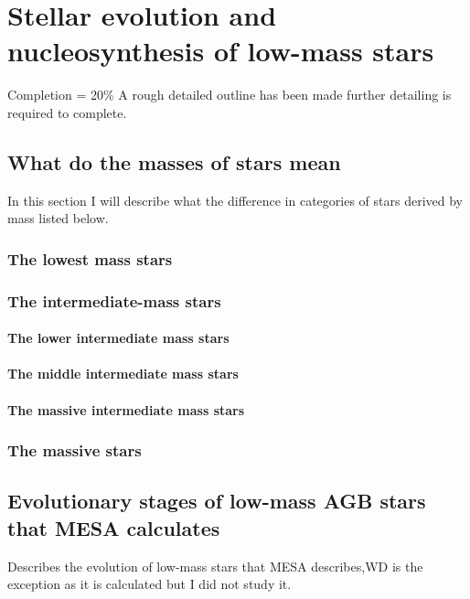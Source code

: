 \chapter{Stellar evolution and nucleosynthesis of low-mass stars}

Completion = 20\% 
A rough detailed outline has been made further detailing is required to complete.

\section{What do the masses of stars mean}

In this section I will describe what the difference in categories of stars derived by mass listed below.

\subsection{The lowest mass stars}

\subsection{The intermediate-mass stars}

\subsubsection{The lower intermediate mass stars}

\subsubsection{The middle intermediate mass stars}

\subsubsection{The massive intermediate mass stars}

\subsection{The massive stars}

\section{Evolutionary stages of low-mass AGB stars that MESA calculates}

Describes the evolution of low-mass stars that MESA describes,WD is the exception as it is calculated but I did not study it.

